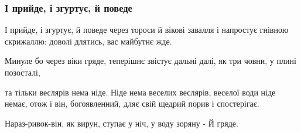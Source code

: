  
 
 

\subsubsection{І прийде, і згуртує, й поведе}
\label{sec:poetry.rus.vasyl_stus.i_pryjde}

І прийде, і згуртує, 
й поведе через тороси й вікові завалля 
і напростує гнівною скрижаллю: 
доволі длятись, вас майбутнє жде. 

Минуле бо через віки гряде, 
теперішнє звістує дальні далі, 
як три човни, у плині позосталі, 

та тільки веслярів нема ніде. 
Ніде нема веселих веслярів, 
веселої води ніде немає, 
отож і він, богоявленний, 
дляє свій щедрий порив і спостерігає. 

Нараз-ривок-він, як вирун, 
ступає у ніч, у воду зоряну -
Й гряде.

